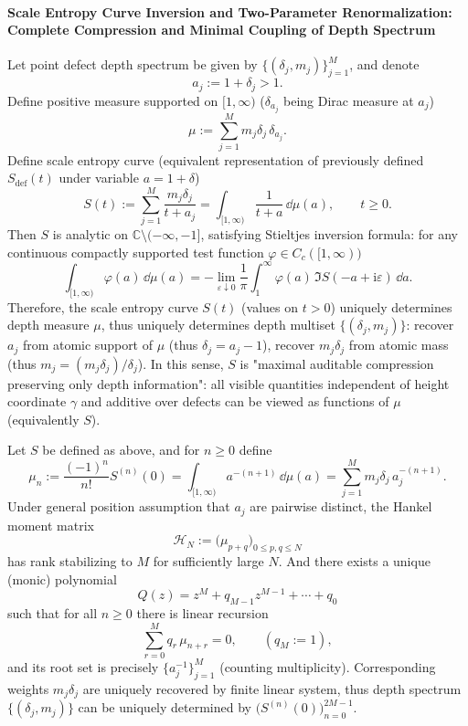 \paragraph{Scale Entropy Curve Inversion and Two-Parameter Renormalization: Complete Compression and Minimal Coupling of Depth Spectrum}

\begin{proposition}
Let point defect depth spectrum be given by \(\{(\delta_j,m_j)\}_{j=1}^{M}\), and denote
\[
a_j:=1+\delta_j>1.
\]
Define positive measure supported on \([1,\infty)\) (\(\delta_{a_j}\) being Dirac measure at \(a_j\))
\[
\mu:=\sum_{j=1}^{M} m_j\delta_j\,\delta_{a_j}.
\]
Define scale entropy curve (equivalent representation of previously defined \(S_{\mathrm{def}}(t)\) under variable \(a=1+\delta\))
\[
S(t):=\sum_{j=1}^{M}\frac{m_j\delta_j}{t+a_j}
=\int_{[1,\infty)}\frac{1}{t+a}\,\dd\mu(a),
\qquad t\ge 0.
\]
Then \(S\) is analytic on \(\mathbb{C}\setminus(-\infty,-1]\), satisfying Stieltjes inversion formula: for any continuous compactly supported test function \(\varphi\in C_c([1,\infty))\)
\[
\int_{[1,\infty)}\varphi(a)\,\dd\mu(a)
=-\lim_{\varepsilon\downarrow0}\frac{1}{\pi}\int_{1}^{\infty}\varphi(a)\,\Im S(-a+\mathrm{i}\varepsilon)\,\dd a.
\]
Therefore, the scale entropy curve \(S(t)\) (values on \(t>0\)) uniquely determines depth measure \(\mu\), thus uniquely determines depth multiset \(\{(\delta_j,m_j)\}\): recover \(a_j\) from atomic support of \(\mu\) (thus \(\delta_j=a_j-1\)), recover \(m_j\delta_j\) from atomic mass (thus \(m_j=(m_j\delta_j)/\delta_j\)).
In this sense, \(S\) is "maximal auditable compression preserving only depth information": all visible quantities independent of height coordinate \(\gamma\) and additive over defects can be viewed as functions of \(\mu\) (equivalently \(S\)).
 \end{proposition}

\begin{proposition}
Let \(S\) be defined as above, and for \(n\ge0\) define
\[
\mu_n:=\frac{(-1)^n}{n!}S^{(n)}(0)
=\int_{[1,\infty)}a^{-(n+1)}\,\dd\mu(a)
=\sum_{j=1}^{M}m_j\delta_j\,a_j^{-(n+1)}.
\]
Under general position assumption that \(a_j\) are pairwise distinct, the Hankel moment matrix
\[
\mathcal{H}_N:=\bigl(\mu_{p+q}\bigr)_{0\le p,q\le N}
\]
has rank stabilizing to \(M\) for sufficiently large \(N\).
And there exists a unique (monic) polynomial
\[
Q(z)=z^{M}+q_{M-1}z^{M-1}+\cdots+q_0
\]
such that for all \(n\ge0\) there is linear recursion
\[
\sum_{r=0}^{M}q_r\,\mu_{n+r}=0,\qquad (q_M:=1),
\]
and its root set is precisely \(\{a_j^{-1}\}_{j=1}^{M}\) (counting multiplicity).
Corresponding weights \(m_j\delta_j\) are uniquely recovered by finite linear system, thus depth spectrum \(\{(\delta_j,m_j)\}\) can be uniquely determined by \(\bigl(S^{(n)}(0)\bigr)_{n=0}^{2M-1}\).
\end{proposition}

